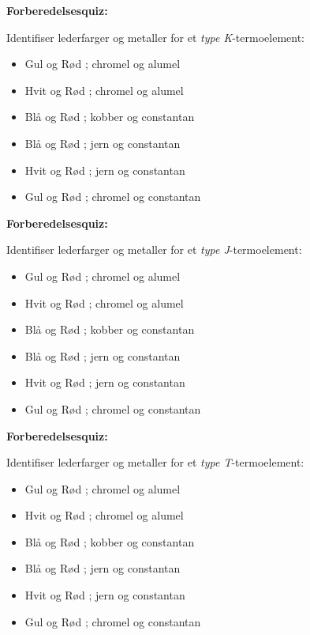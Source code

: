 \vfil \eject

\noindent
{\bf Forberedelsesquiz:}

Identifiser lederfarger og metaller for et {\it type K}-termoelement:

\begin{itemize}
\item{} Gul og Rød ; chromel og alumel
\vskip 5pt
\item{} Hvit og Rød ; chromel og alumel
\vskip 5pt
\item{} Blå og Rød ; kobber og constantan
\vskip 5pt
\item{} Blå og Rød ; jern og constantan
\vskip 5pt
\item{} Hvit og Rød ; jern og constantan
\vskip 5pt
\item{} Gul og Rød ; chromel og constantan
\end{itemize}

\vfil \eject

\noindent
{\bf Forberedelsesquiz:}

Identifiser lederfarger og metaller for et {\it type J}-termoelement:

\begin{itemize}
\item{} Gul og Rød ; chromel og alumel
\vskip 5pt
\item{} Hvit og Rød ; chromel og alumel
\vskip 5pt
\item{} Blå og Rød ; kobber og constantan
\vskip 5pt
\item{} Blå og Rød ; jern og constantan
\vskip 5pt
\item{} Hvit og Rød ; jern og constantan
\vskip 5pt
\item{} Gul og Rød ; chromel og constantan
\end{itemize}

\vfil \eject

\noindent
{\bf Forberedelsesquiz:}

Identifiser lederfarger og metaller for et {\it type T}-termoelement:

\begin{itemize}
\item{} Gul og Rød ; chromel og alumel
\vskip 5pt
\item{} Hvit og Rød ; chromel og alumel
\vskip 5pt
\item{} Blå og Rød ; kobber og constantan
\vskip 5pt
\item{} Blå og Rød ; jern og constantan
\vskip 5pt
\item{} Hvit og Rød ; jern og constantan
\vskip 5pt
\item{} Gul og Rød ; chromel og constantan
\end{itemize}


